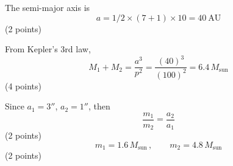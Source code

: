 The semi-major axis is
\[ a = 1/2 \times (7 + 1) \times 10 = 40\ \mathrm{AU} \]
\hfill(2 points)

From Kepler's 3rd law,
\[ M_1 + M_2 = \frac{a^3}{p^2} = \frac{(40)^3}{(100)^2}
   = 6.4\,M_{\mathrm{sun}} \]
\hfill(4 points)

Since $a_1 = 3''$, $a_2 = 1''$, then
\[ \frac{m_1}{m_2} = \frac{a_2}{a_1} \]
\hfill(2 points)
\[ m_1 = 1.6\,M_{\mathrm{sun}}\,,\qquad m_2 = 4.8\,M_{\mathrm{sun}} \]
\hfill(2 points)
